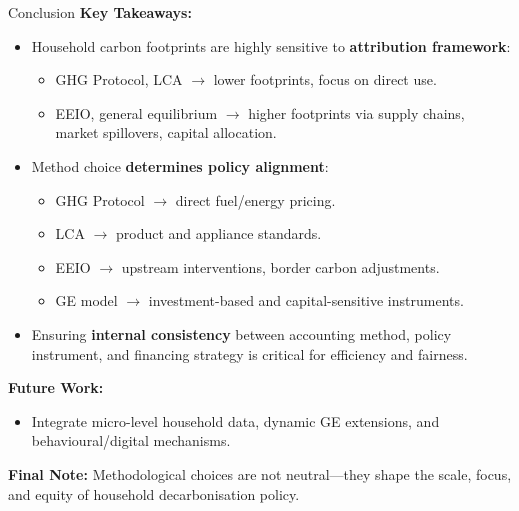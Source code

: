 \documentclass{beamer}
\begin{document}
\begin{frame}{Conclusion}
\footnotesize
\textbf{Key Takeaways:}
\begin{itemize}
    \item Household carbon footprints are highly sensitive to \textbf{attribution framework}:
    \begin{itemize}
        \item GHG Protocol, LCA $\rightarrow$ lower footprints, focus on direct use.
        \item EEIO, general equilibrium $\rightarrow$ higher footprints via supply chains, market spillovers, capital allocation.
    \end{itemize}
    \item Method choice \textbf{determines policy alignment}:
    \begin{itemize}
        \item GHG Protocol $\rightarrow$ direct fuel/energy pricing.
        \item LCA $\rightarrow$ product and appliance standards.
        \item EEIO $\rightarrow$ upstream interventions, border carbon adjustments.
        \item GE model $\rightarrow$ investment-based and capital-sensitive instruments.
    \end{itemize}
    \item Ensuring \textbf{internal consistency} between accounting method, policy instrument, and financing strategy is critical for efficiency and fairness.
\end{itemize}

\vspace{0.4em}
\textbf{Future Work:}
\begin{itemize}
    \item Integrate micro-level household data, dynamic GE extensions, and behavioural/digital mechanisms.
\end{itemize}

\vspace{0.4em}
\textbf{Final Note:}  
Methodological choices are not neutral—they shape the scale, focus, and equity of household decarbonisation policy.
\end{frame}
\end{document}
